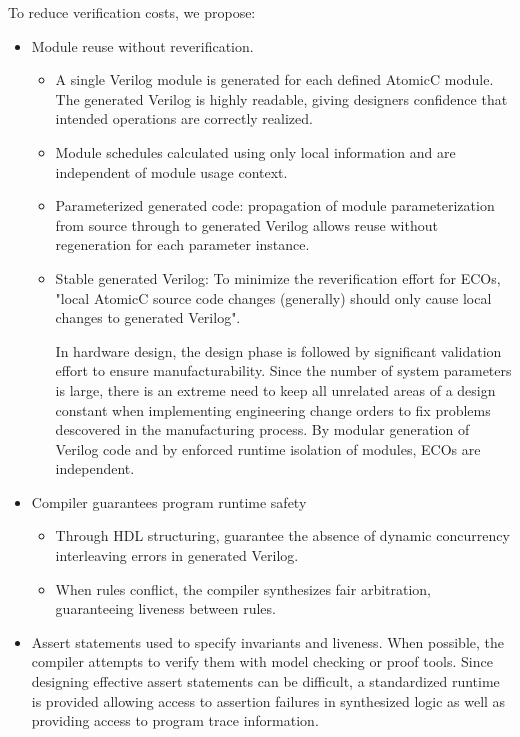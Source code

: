 To reduce verification costs, we propose:
\begin{itemize}
\item Module reuse without reverification.
\begin{itemize}
\item A single Verilog module is generated for each defined AtomicC module.
The generated Verilog is highly readable, giving designers confidence that
intended operations are correctly realized.
\item Module schedules calculated using only local information and are independent of module usage context.
\item Parameterized generated code: propagation of module parameterization from
source through to generated Verilog allows reuse without regeneration for each parameter instance.
\item Stable generated Verilog: To minimize the reverification effort for ECOs,
"local AtomicC source code changes (generally) should only cause local changes to generated Verilog".

In hardware design, the design phase is followed by significant validation effort
to ensure manufacturability.  Since the number of system parameters is
large, there is an extreme need to keep all unrelated areas of a design constant
when implementing engineering change orders to fix problems descovered
in the manufacturing process.
By modular generation of Verilog code and by enforced runtime isolation
of modules, ECOs are independent.

\end{itemize}

\item Compiler guarantees program runtime safety
\begin{itemize}
\item Through HDL structuring, guarantee the absence of dynamic concurrency interleaving errors in generated Verilog.
\item When rules conflict, the compiler synthesizes fair arbitration, guaranteeing liveness between rules.
\end{itemize}

\item Assert statements used to specify invariants and liveness.
When possible, the compiler attempts to verify them with model checking or proof tools.
Since designing effective assert statements can be difficult, a standardized runtime
is provided allowing access to assertion failures in synthesized logic as well
as providing access to program trace information.


\end{itemize}
